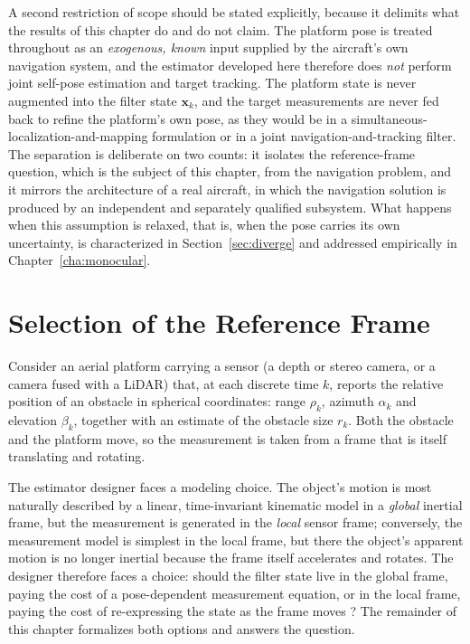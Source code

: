 A second restriction of scope should be stated explicitly, because it delimits
what the results of this chapter do and do not claim. The platform pose is treated
throughout as an \emph{exogenous, known} input supplied by the aircraft's own
navigation system, and the estimator developed here therefore does \emph{not}
perform joint self-pose estimation and target tracking. The platform state is
never augmented into the filter state $\bm{x}_k$, and the target measurements are
never fed back to refine the platform's own pose, as they would be in a
simultaneous-localization-and-mapping formulation or in a joint navigation-and-tracking
filter. The separation is deliberate on two counts: it isolates the
reference-frame question, which is the subject of this chapter, from the
navigation problem, and it mirrors the architecture of a real aircraft, in which
the navigation solution is produced by an independent and separately qualified
subsystem. What happens when this assumption is relaxed, that is, when the pose
carries its own uncertainty, is characterized in Section~\ref{sec:diverge} and
addressed empirically in Chapter~\ref{cha:monocular}.

\section{Selection of the Reference Frame}
\label{sec:selection}

Consider an aerial platform carrying a sensor (a depth or stereo camera, or a
camera fused with a LiDAR) that, at each discrete time $k$, reports the relative
position of an obstacle in spherical coordinates: range $\rho_k$, azimuth
$\alpha_k$ and elevation $\beta_k$, together with an estimate of the obstacle
size $r_k$. Both the obstacle and the platform move, so the measurement is taken
from a frame that is itself translating and rotating.

The estimator designer faces a modeling choice. The object's motion is most
naturally described by a linear, time-invariant kinematic model in a
\emph{global} inertial frame, but the measurement is generated in the
\emph{local} sensor frame; conversely, the measurement model is simplest in the
local frame, but there the object's apparent motion is no longer inertial
because the frame itself accelerates and rotates. The designer therefore faces a
choice: should the filter state live in the global frame, paying the cost of a
pose-dependent measurement equation, or in the local frame, paying the cost of
re-expressing the state as the frame moves \cite{barshalom2001,lerro1993}? The
remainder of this chapter formalizes both options and answers the question.

